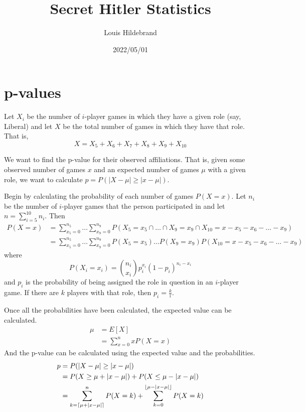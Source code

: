 \documentclass[fleqn, 12pt, letterpaper]{article}
\title{Secret Hitler Statistics}
\author{Louis Hildebrand}
\date{2022/05/01}
\DeclarePairedDelimiter{\ceil}{\lceil}{\rceil}
\DeclarePairedDelimiter{\floor}{\lfloor}{\rfloor}
\begin{document}
\maketitle

\section{p-values}
Let $X_i$ be the number of $i$-player games in which they have a given role (say, Liberal) and let $X$ be the total number of games in which they have that role. That is,
\begin{equation*}
	X = X_5 + X_6 + X_7 + X_8 + X_9 + X_{10}
\end{equation*}

We want to find the p-value for their observed affiliations. That is, given some observed number of games $x$ and an expected number of games $\mu$ with a given role, we want to calculate $p = P(|X - \mu| \geq |x - \mu|)$.

Begin by calculating the probability of each number of games $P(X = x)$. Let $n_i$ be the number of $i$-player games that the person participated in and let $n = \sum_{i=5}^{10} n_i$. Then
\begin{align*}
	P(X = x)
		&= \sum_{x_5=0}^{n_5} \dots \sum_{x_9=0}^{n_9} P(X_5=x_5 \cap \dots \cap X_9=x_9 \cap X_{10}=x-x_5-x_6-\dots-x_9) \\
		&= \sum_{x_5=0}^{n_5} \dots \sum_{x_9=0}^{n_9} P(X_5=x_5) \dots P(X_9=x_9) P(X_{10}=x-x_5-x_6-\dots-x_9)
\end{align*}
where
\begin{equation*}
	P(X_i=x_i) = \binom{n_i}{x_i} p_i^{x_i} (1 - p_i)^{n_i-x_i}
\end{equation*}
and $p_i$ is the probability of being assigned the role in question in an $i$-player game. If there are $k$ players with that role, then $p_i = \frac{k}{i}$.

Once all the probabilities have been calculated, the expected value can be calculated.
\begin{align*}
	\mu
		&= E[X] \\
		&= \sum_{x=0}^n x P(X=x)
\end{align*}
And the p-value can be calculated using the expected value and the probabilities.
\begin{align*}
	p
		&= P(|X - \mu| \geq |x - \mu|) \\
		&= P(X \geq \mu + |x - \mu|) + P(X \leq \mu - |x - \mu|) \\
		&= \sum_{k=\ceil{\mu + |x - \mu|}}^n P(X=k) + \sum_{k=0}^{\floor{\mu - |x - \mu|}} P(X=k)
\end{align*}
\end{document}
